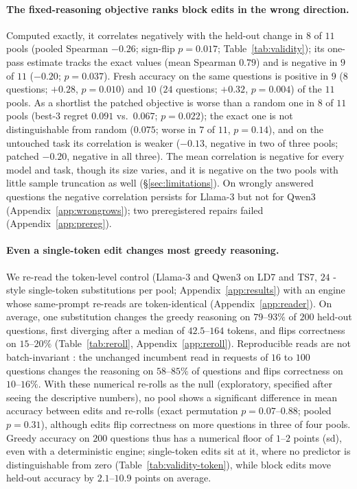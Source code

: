 \paragraph{The fixed-reasoning objective ranks block edits in the wrong direction.}
Computed exactly, it correlates negatively with the held-out change in $8$ of $11$ pools (pooled
Spearman $-0.26$; sign-flip $p=0.017$; Table~\ref{tab:validity}); its one-pass estimate tracks the
exact values (mean Spearman $0.79$) and is negative in $9$ of $11$ ($-0.20$; $p=0.037$). Fresh
accuracy on the same questions is positive in $9$ ($8$ questions; $+0.28$, $p=0.010$) and $10$
($24$ questions; $+0.32$, $p=0.004$) of the $11$ pools. As a shortlist the patched objective is
worse than a random one in $8$ of $11$ pools (best-3 regret $0.091$ vs.\ $0.067$; $p=0.022$); the
exact one is not distinguishable from random ($0.075$; worse in $7$ of $11$, $p=0.14$), and on the
untouched task its correlation is weaker ($-0.13$, negative in two of three pools; patched $-0.20$,
negative in all three). The mean correlation is negative for every model and task, though its size
varies, and it is negative on the two pools with little sample truncation as well
(\S\ref{sec:limitations}). On wrongly
answered questions the negative correlation persists for Llama-3 but not for Qwen3
(Appendix~\ref{app:wrongrows}); two preregistered repairs failed (Appendix~\ref{app:prereg}).

\paragraph{Even a single-token edit changes most greedy reasoning.} We re-read the token-level control
(Llama-3 and Qwen3 on LD7 and TS7, $24$ \greater{}-style single-token substitutions per pool;
Appendix~\ref{app:results}) with an engine whose same-prompt re-reads are token-identical
(Appendix~\ref{app:reader}). On average, one substitution changes the greedy reasoning on $79$--$93\%$ of
$200$ held-out questions, first diverging after a median of $42.5$--$164$ tokens, and flips
correctness on $15$--$20\%$ (Table~\ref{tab:reroll}, Appendix~\ref{app:reroll}). Reproducible
reads are not batch-invariant
\citep{yuan2025nondeterminism,he2025nondeterminism}: the unchanged incumbent read in requests of
$16$ to $100$ questions changes the reasoning on $58$--$85\%$ of questions and flips correctness on
$10$--$16\%$. With these numerical re-rolls as the null (exploratory, specified after seeing the
descriptive numbers), no pool shows a significant difference in mean accuracy between edits and
re-rolls (exact permutation $p=0.07$--$0.88$; pooled $p=0.31$), although edits flip correctness on
more questions in three of four pools. Greedy accuracy on $200$ questions thus
has a numerical floor of $1$--$2$ points (sd), even with a deterministic engine; single-token
edits sit at it, where no predictor is distinguishable from zero (Table~\ref{tab:validity-token}),
while block edits move held-out accuracy by $2.1$--$10.9$ points on average.
